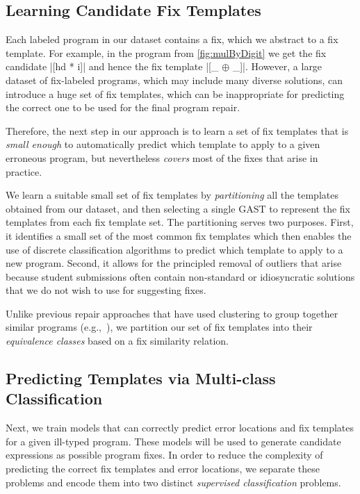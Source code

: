 \subsection{Learning Candidate Fix Templates}
\label{sec:overview:learn}

Each labeled program in our dataset contains a fix, which we abstract to a fix
template. For example, in the \mbd program from \autoref{fig:mulByDigit} we get
the fix candidate |[hd * i]| and hence the fix template |[_ $\oplus$ _]|.
However, a large dataset of fix-labeled programs, which may include many
diverse solutions, can introduce a huge set of fix templates, which can be
inappropriate for predicting the correct one to be used for the final program
repair.

Therefore, the next step in our approach is to learn a set of fix templates
that is \emph{small enough} to automatically predict which template to apply to
a given erroneous program, but nevertheless \emph{covers} most of the fixes that
arise in practice.

 We learn a suitable small set of fix
templates by \emph{partitioning} all the templates obtained from our dataset,
and then selecting a single GAST to represent the fix templates from each fix
template set.
%
The partitioning serves two purposes.
%
First, it identifies a small set of the most common fix templates which then
enables the use of discrete classification algorithms to predict which template
to apply to a new program.
%
Second, it allows for the principled removal of outliers that arise because
student submissions often contain non-standard or idiosyncratic solutions that
we do not wish to use for suggesting fixes.

Unlike previous repair approaches that have used clustering to group together
similar programs (e.g.,~\citep{Wang_2018, Gulwani_2018}), we partition our set of
fix templates into their \emph{equivalence classes} based on a fix similarity
relation.


\subsection{Predicting Templates via Multi-class Classification}
\label{sec:overview:predict}

Next, we train models that can correctly predict error locations and fix
templates for a given ill-typed program. These models will be used to generate
candidate expressions as possible program fixes. In order to reduce the
complexity of predicting the correct fix templates and error locations, we
separate these problems and encode them into two distinct \emph{supervised
classification} problems.

